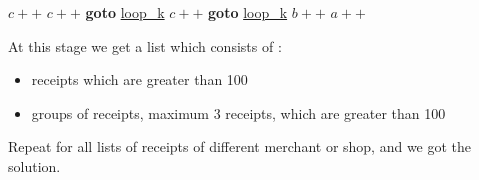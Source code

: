\clearpage

				\begin{algorithm}
				\begin{algorithmic}
								\State $c++$
							\EndIf
						\Else
									\State $c++$
								\EndIf
							\Else
								\State \textbf{goto} \underline{loop\_k}
							\EndIf
						\EndIf
					\Else %
								\State $c++$
							\EndIf
						\Else
							\State \textbf{goto} \underline{loop\_k}
						\EndIf
					\EndIf
				\EndIf
			\EndWhile
		\EndFor
		\State $b++$
		\EndWhile
	\EndFor
	\State $a++$

	\EndWhile
\EndFor
\State {}
\EndFunction
\end{algorithmic}
\end{algorithm}


At this stage we get a list which consists of :
\begin{itemize}
	\item receipts which are greater than 100
	\item groups of receipts, maximum 3 receipts, which are greater than 100
\end{itemize}

Repeat for all lists of receipts of different merchant or shop, and we got the solution.